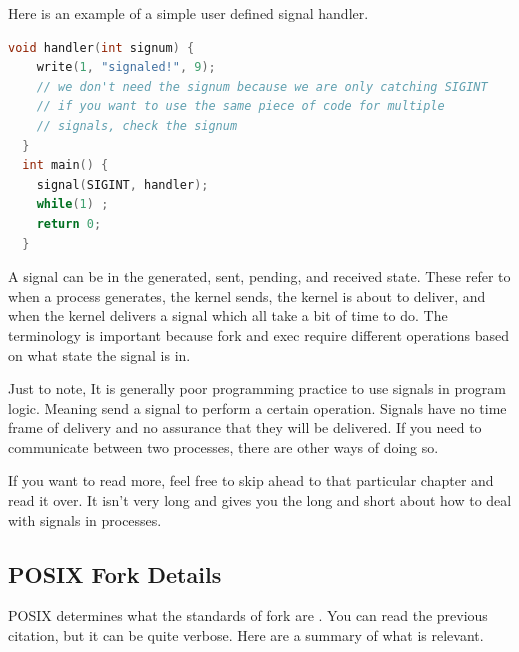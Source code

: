 \begin{itemize}
\begin{itemize}
Here is an example of a simple user defined signal handler.

\begin{lstlisting}[language=C]
  void handler(int signum) {
    write(1, "signaled!", 9);
    // we don't need the signum because we are only catching SIGINT
    // if you want to use the same piece of code for multiple
    // signals, check the signum
  }
  int main() {
    signal(SIGINT, handler);
    while(1) ;
    return 0;
  }
\end{lstlisting}

A signal can be in the generated, sent, pending, and received state. These refer to when a process generates, the kernel sends, the kernel is about to deliver, and when the kernel delivers a signal which all take a bit of time to do.
The terminology is important because fork and exec require different operations based on what state the signal is in.

Just to note, It is generally poor programming practice to use signals in program logic.
Meaning send a signal to perform a certain operation.
Signals have no time frame of delivery and no assurance that they will be delivered.
If you need to communicate between two processes, there are other ways of doing so.


If you want to read more, feel free to skip ahead to that particular chapter and read it over. It isn't very long and gives you the long and short about how to deal with signals in processes.

\subsection{POSIX Fork Details}

POSIX determines what the standards of fork are \cite{fork_2018}.
You can read the previous citation, but it can be quite verbose.
Here are a summary of what is relevant.


\end{itemize}
\end{itemize}
